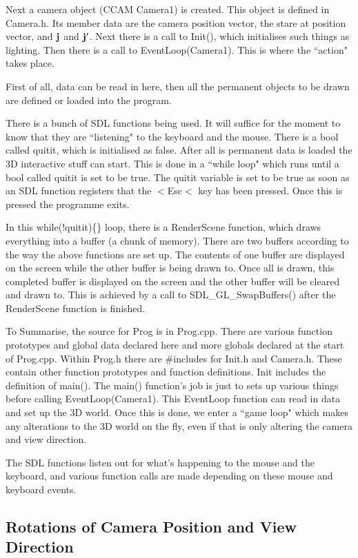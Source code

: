 \documentclass[12pt]{article}
\begin{document}
Next a camera object (CCAM Camera1) is created. 
This object is defined in Camera.h.
Its member data are the camera position vector, the stare
at position vector, and ${\bf j}$ and ${\bf j}^\prime$.
Next there is a call to Init(), which
initialises such things as lighting. Then there is a call
to EventLoop(Camera1). This is where the ``action" takes place.


First of all, data can be read in here, then all the 
permanent objects to be drawn
are defined or loaded into the program.

There is a bunch of SDL functions being used. It will suffice
for the moment to know that they are ``listening" to the
keyboard and the mouse. There is a bool called quitit, which is
initialised as false. After all is permanent data is loaded
the 3D interactive stuff can start. This is done in
a ``while loop"  which runs until a bool called quitit 
is set to be true.
The quitit variable is set to be true as soon as an SDL function registers
that the $<$Esc$<$ key has been pressed. Once this is pressed
the programme exits. 

In this while(!quitit)\{\} loop, there is a RenderScene function, which 
draws everything into a buffer (a chunk of memory). There are two
buffers according to the way the above functions are set up.
The contents of one buffer are displayed on the screen while the other buffer
is being drawn to. Once all is drawn, this completed buffer
is displayed on the screen and the other buffer will be cleared
and  drawn to.
This is achieved by a call to SDL\_GL\_SwapBuffers() after the RenderScene
function is finished.

To Summarise, the source for Prog is in Prog.cpp.
There are various function prototypes and global data declared here
and more globals declared at the start of Prog.cpp.
Within Prog.h there are \#includes for Init.h and
Camera.h. These contain other function prototypes
and function definitions. Init includes the
definition of main(). The main() function's  job is just to
sets up various things before calling
 EventLoop(Camera1). This EventLoop function can read in
data and set up the 3D world. Once this is done, we enter
a ``game loop" which makes any alterations to the
3D world on the fly, even if that is only altering the
camera and view direction.

The SDL functions listen out for what's happening to the mouse
and the keyboard, and various function calls are made
depending on these mouse and keyboard events.

\subsection{Rotations of Camera Position and View Direction}
\end{document}
